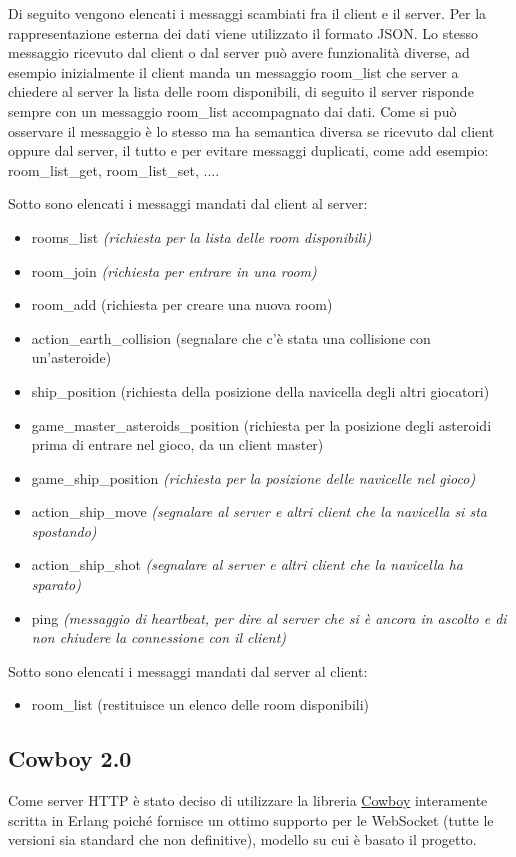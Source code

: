 \documentclass[paper=a4, fontsize=11pt]{scrartcl} %
\numberwithin{equation}{section} %
\numberwithin{figure}{section} %
\numberwithin{table}{section} %
\begin{document}
Di seguito vengono elencati i messaggi scambiati fra il client e il server. Per la rappresentazione esterna dei dati viene utilizzato il formato JSON. Lo stesso messaggio ricevuto dal client o dal server può avere funzionalità diverse, ad esempio inizialmente il client manda un messaggio room\_list che server a chiedere al server la lista delle room disponibili, di seguito il server risponde sempre con un messaggio room\_list accompagnato dai dati. Come si può osservare il messaggio è lo stesso ma ha semantica diversa se ricevuto dal client oppure dal server, il tutto e per evitare messaggi duplicati, come add esempio: room\_list\_get, room\_list\_set, ....

Sotto sono elencati i messaggi mandati dal client al server:
\begin{itemize}
\item rooms\_list \textit{(richiesta per la lista delle room disponibili)}
\item room\_join \textit{(richiesta per entrare in una room)}
\item room\_add (richiesta per creare una nuova room)
\item action\_earth\_collision (segnalare che c'è stata una collisione con un'asteroide)
\item ship\_position (richiesta della posizione della navicella degli altri giocatori)
\item game\_master\_asteroids\_position (richiesta per la posizione degli asteroidi prima di entrare nel gioco, da un client master)
\item game\_ship\_position \textit{(richiesta per la posizione delle navicelle nel gioco)}
\item action\_ship\_move \textit{(segnalare al server e altri client che la navicella si sta spostando)}
\item action\_ship\_shot \textit{(segnalare al server e altri client che la navicella ha sparato)}
\item ping \textit{(messaggio di heartbeat, per dire al server che si è ancora in ascolto e di non chiudere la connessione con il client)}
\end{itemize}


Sotto sono elencati i messaggi mandati dal server al client:
\begin{itemize}
\item room\_list (restituisce un elenco delle room disponibili)
\end{itemize}

\subsection{Cowboy 2.0}
Come server HTTP è stato deciso di utilizzare la libreria \href{https://github.com/ninenines/cowboy}{Cowboy} interamente scritta in Erlang poiché fornisce un ottimo supporto per le WebSocket (tutte le versioni sia standard che non definitive), modello su cui è basato il progetto.
\end{document}
